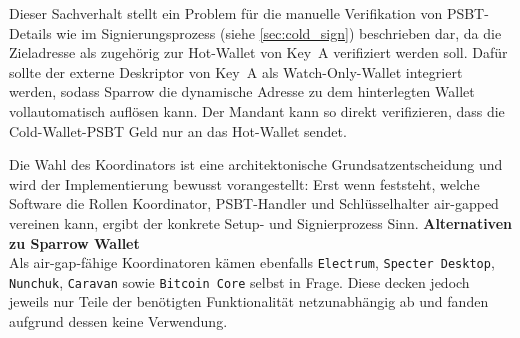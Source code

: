 Dieser Sachverhalt stellt ein Problem für die manuelle Verifikation von \ac{PSBT}-Details wie im Signierungsprozess (siehe \ref{sec:cold_sign}) beschrieben dar, da die Zieladresse als zugehörig zur Hot-Wallet von Key~A verifiziert werden soll.
Dafür sollte der externe Deskriptor von Key~A als Watch-Only-Wallet integriert werden, sodass Sparrow die dynamische Adresse zu dem hinterlegten Wallet vollautomatisch auflösen kann. Der Mandant kann so direkt verifizieren, dass die Cold-Wallet-\ac{PSBT} Geld nur an das Hot-Wallet sendet. 

Die Wahl des Koordinators ist eine architektonische Grundsatzentscheidung und wird der Implementierung bewusst vorangestellt: Erst wenn feststeht, welche Software die Rollen Koordinator, \ac{PSBT}-Handler und Schlüsselhalter air-gapped vereinen kann, ergibt der konkrete Setup- und Signierprozess Sinn.
\textbf{Alternativen zu Sparrow Wallet} \label{sec:alt_sparrow} \\
Als air-gap-fähige Koordinatoren kämen ebenfalls \texttt{Electrum}, \texttt{Specter Desktop}, \texttt{Nunchuk}, \texttt{Caravan} sowie \texttt{Bitcoin Core} selbst in Frage. Diese decken jedoch jeweils nur Teile der benötigten Funktionalität netzunabhängig ab und fanden aufgrund dessen keine Verwendung.

